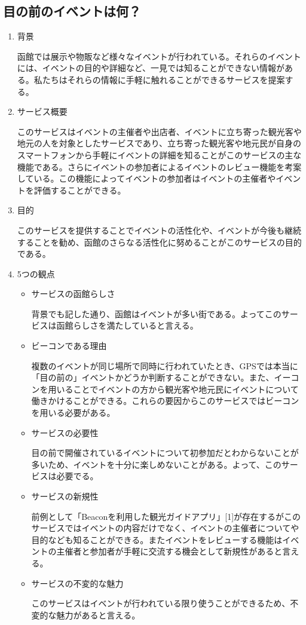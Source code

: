 \subsection{目の前のイベントは何？}
\begin{enumerate}
    \item 背景
    \par 函館では展示や物販など様々なイベントが行われている。それらのイベントには、イベントの目的や詳細など、一見では知ることができない情報がある。私たちはそれらの情報に手軽に触れることができるサービスを提案する。
    \item サービス概要
    \par このサービスはイベントの主催者や出店者、イベントに立ち寄った観光客や地元の人を対象としたサービスであり、立ち寄った観光客や地元民が自身のスマートフォンから手軽にイベントの詳細を知ることがこのサービスの主な機能である。さらにイベントの参加者によるイベントのレビュー機能を考案している。この機能によってイベントの参加者はイベントの主催者やイベントを評価することができる。
    \item 目的
    \par このサービスを提供することでイベントの活性化や、イベントが今後も継続することを勧め、函館のさらなる活性化に努めることがこのサービスの目的である。
    \item 5つの観点
    \begin{itemize}
        \item サービスの函館らしさ
        \par 背景でも記した通り、函館はイベントが多い街である。よってこのサービスは函館らしさを満たしていると言える。
        \item ビーコンである理由
        \par 複数のイベントが同じ場所で同時に行われていたとき、GPSでは本当に「目の前の」イベントかどうか判断することができない。また、イーコンを用いることでイベントの方から観光客や地元民にイベントについて働きかけることができる。これらの要因からこのサービスではビーコンを用いる必要がある。
        \item サービスの必要性
        \par 目の前で開催されているイベントについて初参加だとわからないことが多いため、イベントを十分に楽しめないことがある。よって、このサービスは必要でる。
        \item サービスの新規性
        \par 前例として「Beaconを利用した観光ガイドアプリ」[1]が存在するがこのサービスではイベントの内容だけでなく、イベントの主催者についてや目的なども知ることができる。またイベントをレビューする機能はイベントの主催者と参加者が手軽に交流する機会として新規性があると言える。
        \item サービスの不変的な魅力
        \par このサービスはイベントが行われている限り使うことができるため、不変的な魅力があると言える。
    \end{itemize}
\end{enumerate}

